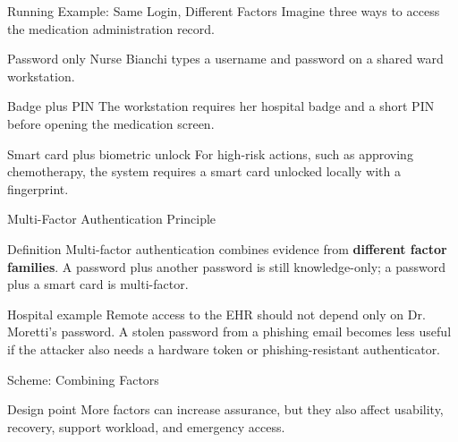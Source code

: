 \documentclass[presentation]{beamer}
\begin{document}
\begin{frame}[c]{Running Example: Same Login, Different Factors}
  Imagine three ways to access the medication administration record.

  \begin{exampleblock}{Password only}
    Nurse Bianchi types a username and password on a shared ward workstation.
  \end{exampleblock}

  \begin{exampleblock}{Badge plus PIN}
    The workstation requires her hospital badge and a short PIN before opening the medication screen.
  \end{exampleblock}

  \begin{exampleblock}{Smart card plus biometric unlock}
    For high-risk actions, such as approving chemotherapy, the system requires a smart card unlocked locally with a fingerprint.
  \end{exampleblock}
\end{frame}

\begin{frame}[c]{Multi-Factor Authentication Principle}
  \begin{block}{Definition}
    Multi-factor authentication combines evidence from \textbf{different factor families}. A password plus another password is still knowledge-only; a password plus a smart card is multi-factor.
  \end{block}

  \begin{exampleblock}{Hospital example}
    Remote access to the EHR should not depend only on Dr. Moretti's password. A stolen password from a phishing email becomes less useful if the attacker also needs a hardware token or phishing-resistant authenticator.
  \end{exampleblock}
\end{frame}

\begin{frame}[c]{Scheme: Combining Factors}
  \begin{center}
  \end{center}

  \vspace{0.2cm}
  \begin{block}{Design point}
    More factors can increase assurance, but they also affect usability, recovery, support workload, and emergency access.
  \end{block}
\end{frame}
\end{document}
